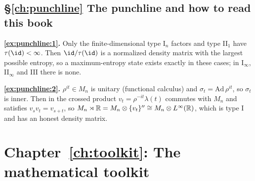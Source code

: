 {\subsection*{\S\ref{ch:punchline} The punchline and how to read this book}
\textbf{\ref{ex:punchline:1}.} Only the finite-dimensional type I$_n$ factors and type II$_1$ have $\tau(\id)<\infty$. Then $\id/\tau(\id)$ is a normalized density matrix with the largest possible entropy, so a maximum-entropy state exists exactly in these cases; in I$_\infty$, II$_\infty$ and III there is none.\par
\textbf{\ref{ex:punchline:2}.} $\rho^{it}\in M_n$ is unitary (functional calculus) and $\sigma_t=\mathrm{Ad}\,\rho^{it}$, so $\sigma_t$ is inner. Then in the crossed product $v_t=\rho^{-it}\lambda(t)$ commutes with $M_n$ and satisfies $v_sv_t=v_{s+t}$, so $M_n\rtimes\mathbb{R}=M_n\otimes\{v_t\}''\cong M_n\otimes L^\infty(\mathbb{R})$, which is type I and has an honest density matrix.\par

\section*{Chapter~\ref{ch:toolkit}: The mathematical toolkit}

}
